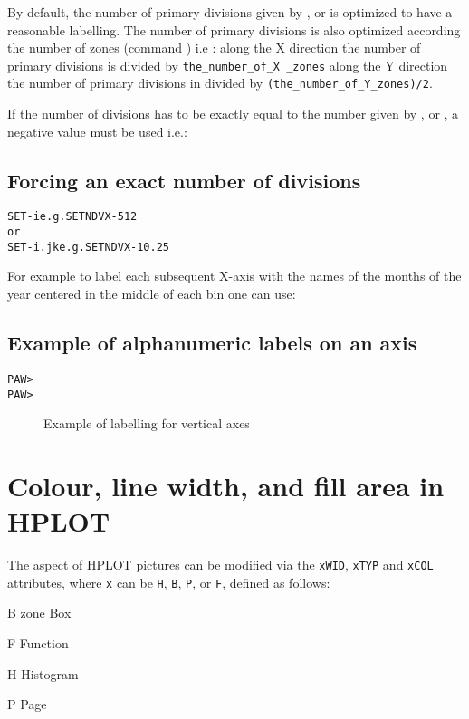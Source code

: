 By default, the number of primary divisions given by , 
 or  is optimized to have a 
reasonable labelling. The number of primary divisions is also optimized 
according the number of zones (command ) i.e : 
along the X direction the number of primary divisions is divided by 
\texttt{the_number_of_X _zones} along the Y direction the number of primary 
divisions in divided by \texttt{(the_number_of_Y_zones)/2}.

If the number of divisions has to be exactly equal to the
number given by ,  or
, a negative value must be used i.e.:
\subsection*{Forcing an exact number of divisions}
\begin{alltt}
    SET  -i            e.g. SET NDVX -512
or
    SET  -i.jk         e.g. SET NDVX -10.25
\end{alltt}

For example to label each subsequent X-axis with the names of the
months of the year centered in the middle of each bin one can use:
\subsection*{Example of alphanumeric labels on an axis}
\begin{alltt}
PAW > 
PAW > 
\end{alltt}

\begin{figure}[p]
\begin{center}\mbox{}\end{center}
\caption{Example of labelling for vertical axes}
\label{fig:LABNDVY}
\end{figure}

\section{Colour, line width, and fill area in HPLOT}

The aspect of HPLOT pictures can be modified via the \texttt{xWID}, \texttt{xTYP}
and \texttt{xCOL} attributes, where \texttt{x} can be \texttt{H}, \texttt{B},
\texttt{P}, or \texttt{F}, defined as follows:
\begin{DLtt}{12}
\item[B] zone Box
\item[F] Function
\item[H] Histogram
\item[P] Page
\end{DLtt}

